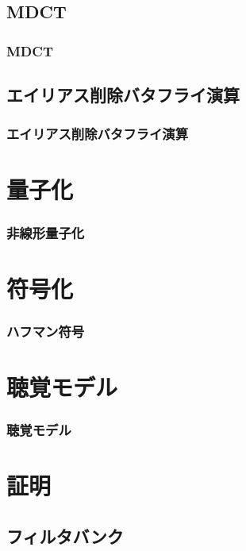 \documentclass[14pt,xcolor=dvipsnames,table,dvipdfmx]{beamer}
\begin{document}
\subsection{MDCT}

\begin{frame}[c]
    \frametitle{MDCT}
\end{frame}

\subsection{エイリアス削除バタフライ演算}

\begin{frame}[c]
    \frametitle{エイリアス削除バタフライ演算}
\end{frame}

\section{量子化}

\begin{frame}[c]
    \frametitle{非線形量子化}
\end{frame}

\section{符号化}

\begin{frame}[c]
    \frametitle{ハフマン符号}
\end{frame}

\section{聴覚モデル}

\begin{frame}[c]
    \frametitle{聴覚モデル}
\end{frame}

\appendix

\section{証明}

\subsection{フィルタバンク} \label{sec:proofs_filter_bank}
\end{document}
